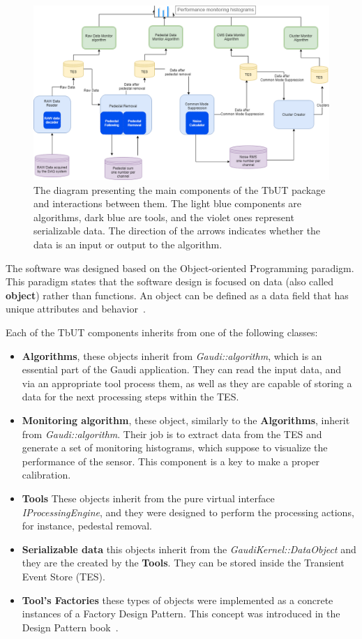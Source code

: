 \begin{figure}[h]
\centering
\includegraphics{figures/TBUT.png}
\caption{The diagram presenting the main components of the TbUT package and interactions between them. The light blue components are algorithms, dark blue are tools, and the violet ones represent serializable data. The direction of the arrows indicates whether the data is an input or output to the algorithm. }
\label{fig:TbUT}
\end{figure}


The software was designed based on the Object-oriented Programming paradigm.   This paradigm states that the software design is focused on data (also called \textbf{object}) rather than functions. An object can be defined as a data field that has unique attributes and behavior~\cite{programming_paradigma}. 

Each of the TbUT components inherits from one of the following classes:  

\begin{itemize}
    \item \textbf{Algorithms}, these objects inherit from \textit{Gaudi::algorithm}, which is an essential part of the Gaudi application. They can read the input data, and via an appropriate tool process them, as well as they are capable of storing a data for the next processing steps within the TES. 
    \item \textbf{Monitoring algorithm}, these object, similarly to the \textbf{Algorithms}, inherit from  \textit{Gaudi::algorithm}. Their job is to extract data from the TES and generate a set of monitoring histograms, which suppose to visualize the performance of the sensor. This component is a key to make a proper calibration. 
    \item \textbf{Tools} These objects inherit from the pure virtual interface \textit{IProcessingEngine}, and they were designed to perform the processing actions, for instance, pedestal removal. 
    \item \textbf{Serializable data} this objects inherit from the \textit{GaudiKernel::DataObject} and they are the created by the \textbf{Tools}. They can be stored inside the Transient Event Store (TES). 
    \item \textbf{ Tool's Factories} these types of objects were implemented as a concrete instances of a Factory Design Pattern. This concept was introduced in the Design Pattern book~\cite{DesignPatterns}. 
\end{itemize}

